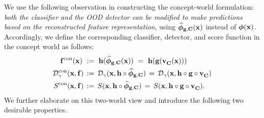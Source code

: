 We use the following observation in constructing the concept-world formulation: {\em both the classifier and the OOD detector can be modified to make predictions based on the reconstructed feature representation}, \ie using $\widehat{\bm{\phi}}_{\mathbf{g}, \mathbf{C}}(\mathbf{x})$ instead of $\bm{\phi}(\mathbf{x})$. 
Accordingly, we define the corresponding classifier, detector, and score function in the concept world as follows:
\begin{align}
\label{equ:concept_world}
\centering
\fcon(\bfx) ~&:=~ \bfh(\recphi(\bfx)) ~=~ \bfh(\bfg(\VC(\bfx))) \nonumber \\
\Dcon(\bfx, \bff) \,&:=\, \calD_\gamma(\bfx, \bfh \circ \recphi) \,=\, \calD_\gamma(\bfx, \bfh \circ \bfg \circ \VC) \nonumber \\
\centering
\Scon(\bfx, \bff) \,&:=\, S(\bfx, \bfh \circ \recphi) \,=\, S(\bfx, \bfh \circ \bfg \circ \VC).
\end{align}
%
%
We further elaborate on this two-world view and introduce the following two desirable properties.




